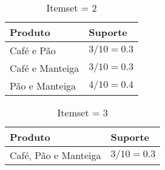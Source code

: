 \documentclass[12pt]{article}
\begin{document}
\begin{table}[h]
	\begin{center}

		\begin{tabular}{| l | l |}
			\hline
			\textbf{Produto} & \textbf{Suporte} \\ \hline
			Café e Pão       & $3/10=0.3$       \\ \hline
			Café e Manteiga  & $3/10=0.3$       \\ \hline
			Pão e Manteiga   & $4/10=0.4$       \\ \hline
		\end{tabular}
		\caption{\label{tab:itemset1.2}Itemset = 2}
	\end{center}
\end{table}

\begin{table}[h]
	\begin{center}

		\begin{tabular}{| l | l |}
			\hline
			\textbf{Produto}     & \textbf{Suporte} \\ \hline
			Café, Pão e Manteiga & $3/10=0.3$       \\ \hline
		\end{tabular}
		\caption{\label{tab:itemset1.3}Itemset = 3}
	\end{center}
\end{table}
\end{document}
